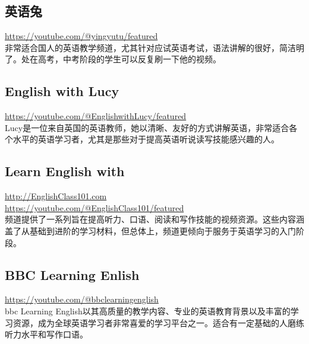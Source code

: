 \documentclass[11pt]{article}
\begin{document}
\subsection{英语兔}
\label{sec:org3215442}
\url{https://youtube.com/@yingyutu/featured} \\
非常适合国人的英语教学频道，尤其针对应试英语考试，语法讲解的很好，简洁明了。处在高考，中考阶段的学生可以反复刷一下他的视频。

\subsection{English with Lucy}
\label{sec:orge83716e}
\url{https://youtube.com/@EnglishwithLucy/featured} \\
Lucy是一位来自英国的英语教师，她以清晰、友好的方式讲解英语，非常适合各个水平的英语学习者，尤其是那些对于提高英语听说读写技能感兴趣的人。

\subsection{Learn English with}
\label{sec:org1e4d8e4}
\url{http://EnglishClass101.com} \\
\url{https://youtube.com/@EnglishClass101/featured} \\
频道提供了一系列旨在提高听力、口语、阅读和写作技能的视频资源。这些内容涵盖了从基础到进阶的学习材料，但总体上，频道更倾向于服务于英语学习的入门阶段。

\subsection{BBC Learning Enlish}
\label{sec:orgc0eb3a6}
\url{https://youtube.com/@bbclearningenglish} \\
bbc Learning English以其高质量的教学内容、专业的英语教育背景以及丰富的学习资源，成为全球英语学习者非常喜爱的学习平台之一。适合有一定基础的人磨练听力水平和写作口语。
\end{document}
